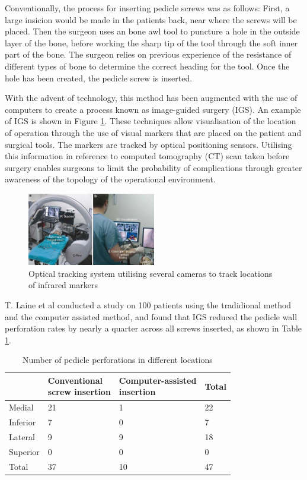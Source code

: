 \documentclass[conference, a4paper]{IEEEtran}
\begin{document}
Conventionally, the process for inserting pedicle screws was as follows:
First, a large insicion would be made in the patients back, near
where the screws will be placed. Then the surgeon uses an bone awl tool
to puncture a hole in the outside layer of the bone, before working the
sharp tip of the tool through the soft inner part of the bone. The surgeon
relies on previous experience of the resistance of different types of bone to
determine the correct heading for the tool. Once the hole has been created,
the pedicle screw is inserted.

With the advent of technology, this method has been augmented with the use of computers to
create a process known as image-guided surgery (IGS). An example of IGS is shown in Figure \ref{fig:igs}.
These techniques allow
visualisation of the location of operation through the use of visual markers that are
placed on the patient and surgical tools. The markers are tracked by optical positioning sensors. Utilising this
information in reference to computed tomography (CT) scan taken before surgery enables surgeons to limit the
probability of complications through greater awareness of the topology of the operational environment\cite{Costa2011}.

\begin{figure}[h!]
	\centering
	\includegraphics[width=0.5\textwidth]{assets/igs}
	\caption{Optical tracking system utilising several cameras to track locations of infrared markers\cite{Manbachi2016}}
	\label{fig:igs}
\end{figure}


T. Laine et al conducted a study on 100 patients using the tradidional method and the 
computer assisted method, and found that IGS reduced the pedicle wall perforation rates by 
nearly a quarter across all screws inserted, as shown in Table \ref{tab:accuracy}\cite{Laine2000}.
\begin{table}[h!]
	\centering
	\begin{tabular}{l l l l }
		& \shortstack{Conventional\\screw insertion} & \shortstack{Computer-assisted\\insertion} & Total \\ \hline
		Medial & 21 & 1 & 22 \\ \hline
		Inferior & 7 & 0 & 7 \\ \hline
		Lateral & 9 & 9 & 18 \\ \hline
		Superior & 0 & 0 & 0 \\ \hline
		Total & 37 &10 & 47 \\
	\end{tabular}
	\caption{Number of pedicle perforations in different locations\cite{Laine2000}}
	\label{tab:accuracy}
\end{table}
\end{document}
